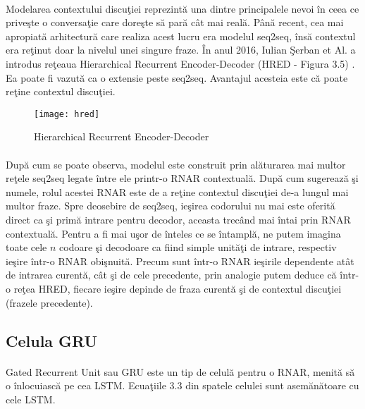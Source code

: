 \paragraph{}
Modelarea contextului discu\c tiei reprezint\u a una dintre principalele nevoi \^ in ceea ce prive\c ste o conversa\c tie care dore\c ste s\u a par\u a c\^ at mai real\u a. P\^ an\u a recent, cea mai apropiat\u a arhitectur\u a care realiza acest lucru era modelul seq2seq, \^ ins\u a contextul era re\c tinut doar la nivelul unei singure fraze. \^ In anul 2016, Iulian \c Serban et Al. a introdus re\c teaua Hierarchical Recurrent Encoder-Decoder (HRED - Figura 3.5) \cite{DBLP:journals/corr/SerbanSBCP15}. Ea poate fi vazut\u a ca o extensie peste seq2seq. Avantajul acesteia este c\u a poate re\c tine contextul discu\c tiei.

\begin{figure}[H]
\centering
\texttt{[image: hred]}
\caption{Hierarchical Recurrent Encoder-Decoder}
\end{figure} 

\paragraph{}
Dup\u a cum se poate observa, modelul este construit prin al\u aturarea mai multor re\c tele seq2seq legate \^ intre ele printr-o RNAR contextual\u a. Dup\u a cum sugereaz\u a \c si numele, rolul acestei RNAR este de a re\c tine contextul discu\c tiei de-a lungul mai multor fraze. Spre deosebire de seq2seq, ie\c sirea codorului nu mai este oferit\u a direct ca \c si prim\u a intrare pentru decodor, aceasta trec\^ and mai \^ intai prin RNAR contextual\u a. Pentru a fi mai u\c sor de \^ inteles ce se \^ intampl\u a, ne putem imagina toate cele \(n\) codoare \c si decodoare ca fiind simple unit\u a\c ti de intrare, respectiv ie\c sire \^ intr-o RNAR obi\c snuit\u a. Precum sunt \^ intr-o RNAR ie\c sirile dependente at\^ at de intrarea curent\u a, c\^ at \c si de cele precedente, prin analogie putem deduce c\u a \^ intr-o re\c tea HRED, fiecare ie\c sire depinde de fraza curent\u a \c si de contextul discu\c tiei (frazele precedente).

\subsection{Celula GRU}

\paragraph{}
Gated Recurrent Unit sau GRU \cite{DBLP:journals/corr/ChungGCB14} este un tip de celul\u a pentru o RNAR, menit\u a s\u a o \^ inlocuiasc\u a pe cea LSTM. Ecua\c tiile 3.3 din spatele celulei sunt asem\u an\u atoare cu cele LSTM.


